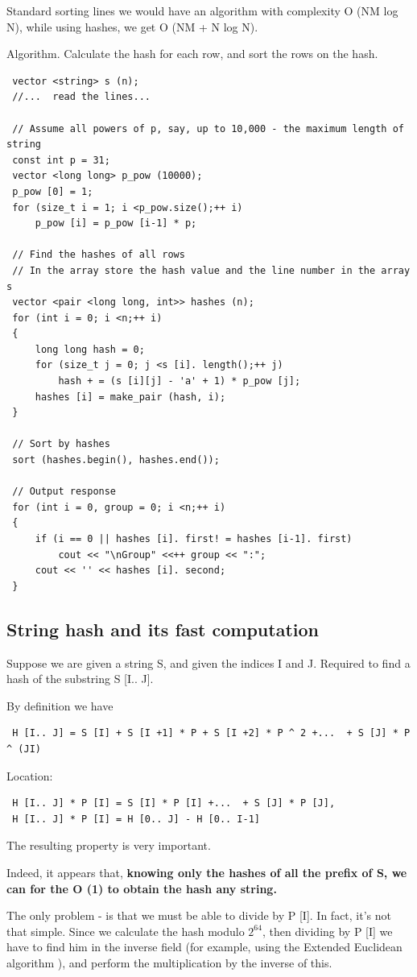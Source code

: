 Standard sorting lines we would have an algorithm with complexity O (NM log N), while using hashes, we get O (NM + N log N).

Algorithm. Calculate the hash for each row, and sort the rows on the hash.
\begin{verbatim}
 vector <string> s (n);
 //...  read the lines...

 // Assume all powers of p, say, up to 10,000 - the maximum length of string
 const int p = 31;
 vector <long long> p_pow (10000);
 p_pow [0] = 1;
 for (size_t i = 1; i <p_pow.size();++ i)
     p_pow [i] = p_pow [i-1] * p;

 // Find the hashes of all rows
 // In the array store the hash value and the line number in the array s
 vector <pair <long long, int>> hashes (n);
 for (int i = 0; i <n;++ i)
 {
     long long hash = 0;
     for (size_t j = 0; j <s [i]. length();++ j)
         hash + = (s [i][j] - 'a' + 1) * p_pow [j];
     hashes [i] = make_pair (hash, i);
 }

 // Sort by hashes
 sort (hashes.begin(), hashes.end());

 // Output response
 for (int i = 0, group = 0; i <n;++ i)
 {
     if (i == 0 || hashes [i]. first! = hashes [i-1]. first)
         cout << "\nGroup" <<++ group << ":";
     cout << '' << hashes [i]. second;
 } 
\end{verbatim}
\subsection{ String hash and its fast computation }
Suppose we are given a string S, and given the indices I and J. Required to find a hash of the substring S [I.. J].

By definition we have
\begin{verbatim}
 H [I.. J] = S [I] + S [I +1] * P + S [I +2] * P ^ 2 +...  + S [J] * P ^ (JI) 
\end{verbatim}
Location:
\begin{verbatim}
 H [I.. J] * P [I] = S [I] * P [I] +...  + S [J] * P [J],
 H [I.. J] * P [I] = H [0.. J] - H [0.. I-1] 
\end{verbatim}
The resulting property is very important.

Indeed, it appears that, \textbf{knowing only the hashes of all the prefix of S, we can for the O (1) to obtain the hash any string.}

The only problem - is that we must be able to divide by P [I]. In fact, it's not that simple. Since we calculate the hash modulo $2 ^ 64$, then dividing by P [I] we have to find him in the inverse field (for example, using the Extended Euclidean algorithm ), and perform the multiplication by the inverse of this.

